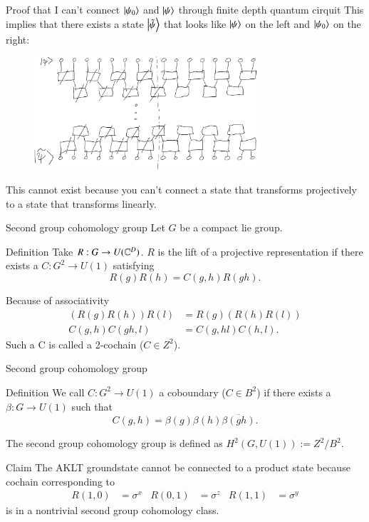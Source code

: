 \documentclass{beamer}
\begin{document}
\begin{frame}{Proof that I can't connect $\ket{\psi_0}$ and $\ket{\psi}$ through finite depth quantum cirquit}
	This implies that there exists a state $\ket{\tilde\psi}$ that looks like $\ket{\psi}$ on the left and $\ket{\psi_0}$ on the right:
	\begin{figure}
		\center
		\includegraphics[width=0.75\textwidth]{Figures/ConnectingPsiAndPsi0Proof2.png}
	\end{figure}
	\pause
	This cannot exist because you can't connect a state that transforms projectively to a state that transforms linearly.
\end{frame}

\begin{frame}{Second group cohomology group}
	Let $G$ be a compact lie group.
	\begin{block}{Definition}
		Take $R:G\rightarrow U(\mathbb{C}^D)$. $R$ is the lift of a projective representation if there exists a $C:G^2\rightarrow U(1)$ satisfying
		\[R(g)R(h)=C(g,h)R(gh).\]
	\end{block}
	\pause
	Because of associativity
	\begin{align*}
		(R(g)R(h))R(l)&=R(g)(R(h)R(l))\\
		C(g,h)C(gh,l)&=C(g,hl)C(h,l).
	\end{align*}
	Such a C is called a 2-cochain ($C\in Z^2$).
\end{frame}

\begin{frame}{Second group cohomology group}
	\begin{block}{Definition}
		We call $C:G^2\rightarrow U(1)$ a coboundary ($C\in B^2$) if there exists a $\beta:G\rightarrow U(1)$ such that
		\[C(g,h)=\beta(g)\beta(h)\overline{\beta(gh)}.\]
	\end{block}
	The second group cohomology group is defined as $H^2(G,U(1)):=Z^2/B^2$.
	\pause
	\begin{block}{Claim}
		The AKLT groundstate cannot be connected to a product state because cochain corresponding to
		\begin{align*}
			R(1,0)&=\sigma^x&R(0,1)&=\sigma^z&R(1,1)&=\sigma^y
		\end{align*}
		is in a nontrivial second group cohomology class.
	\end{block}
\end{frame}
\end{document}
